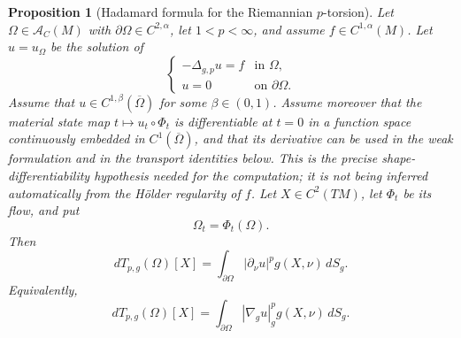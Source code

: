 \documentclass{article}
\newtheorem{proposition}[theorem]{Proposition}
\begin{document}
\begin{proposition}[Hadamard formula for the Riemannian $p$-torsion]
\label{prop:hadamard-p-torsion}
Let $\Omega\in\mathcal A_C(M)$ with
$\partial\Omega\in C^{2,\alpha}$, let $1<p<\infty$, and assume
$f\in C^{1,\alpha}(M)$. Let $u=u_\Omega$ be the solution of
\[
\begin{cases}
-\Delta_{g,p}u=f & \text{in }\Omega,\\
u=0 & \text{on }\partial\Omega.
\end{cases}
\]
Assume that $u\in C^{1,\beta}(\overline\Omega)$ for some $\beta\in(0,1)$.
Assume moreover that the material state map $t\mapsto u_t\circ\Phi_t$ is differentiable at $t=0$ in a function space continuously embedded in $C^1(\overline\Omega)$, and that its derivative can be used in the weak formulation and in the transport identities below. This is the precise shape-differentiability hypothesis needed for the computation; it is not being inferred automatically from the Hölder regularity of $f$.
Let $X\in C^2(TM)$, let $\Phi_t$ be its flow, and put
\[
\Omega_t=\Phi_t(\Omega).
\]
Then
\begin{equation}
dT_{p,g}(\Omega)[X]
=
\int_{\partial\Omega}
|\partial_\nu u|^p g(X,\nu)\,dS_g.
\label{eq:hadamard-p-torsion}
\end{equation}
Equivalently,
\[
dT_{p,g}(\Omega)[X]
=
\int_{\partial\Omega}
|\nabla_g u|_g^p g(X,\nu)\,dS_g.
\]
\end{proposition}
\end{document}
